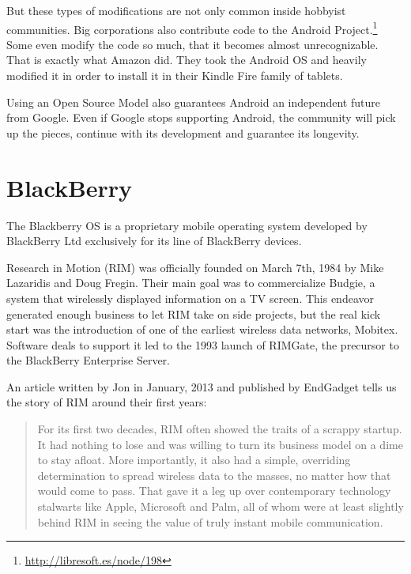 But these types of modifications are not only common inside hobbyist communities. Big corporations also contribute code to the Android Project.\footnote{\url{http://libresoft.es/node/198}} Some even modify the code so much, that it becomes almost unrecognizable. That is exactly what Amazon did. They took the Android \ac{OS} and heavily modified it in order to install it in their Kindle Fire family of tablets.


Using an Open Source Model also guarantees Android an independent future from Google. Even if Google stops supporting  Android, the community will pick up the pieces, continue with its development and guarantee its longevity.

\section{BlackBerry}
The Blackberry \ac{OS} is a proprietary mobile operating system developed by BlackBerry Ltd exclusively for its line of BlackBerry devices.

Research in Motion (RIM) was officially founded on March 7th, 1984 by Mike Lazaridis and Doug Fregin. Their main goal was to commercialize Budgie, a system that wirelessly displayed information on a TV screen. This endeavor generated enough business to let RIM take on side projects, but the real kick start was the introduction of one of the earliest wireless data networks, Mobitex. Software deals to support it led to the 1993 launch of RIMGate, the precursor to the BlackBerry Enterprise Server.

An article written by Jon \citeauthor{fingas:2013} in January, 2013 and published by EndGadget tells us the story of RIM around their first years:

\begin{quotation}
For its first two decades, RIM often showed the traits of a scrappy startup. It had nothing to lose and was willing to turn its business model on a dime to stay afloat. More importantly, it also had a simple, overriding determination to spread wireless data to the masses, no matter how that would come to pass. That gave it a leg up over contemporary technology stalwarts like Apple, Microsoft and Palm, all of whom were at least slightly behind RIM in seeing the value of truly instant mobile communication.
\cite{fingas:2013}
\end{quotation}


